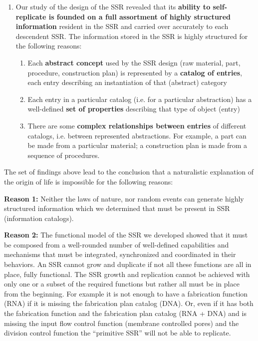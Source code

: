 \begin{enumerate}
\item Our study of the design of the SSR revealed that its
\textbf{ability to self-replicate is founded on a full assortment of
highly structured information} resident in the SSR and carried over
accurately to each descendent SSR.  The information stored in the SSR
is highly structured for the following reasons:

\begin{enumerate}
\item Each \textbf{abstract concept} used by the SSR design (raw
material, part, procedure, construction plan) is represented by a
\textbf{catalog of entries}, each entry describing an instantiation of
that (abstract) category
\item Each entry in a particular catalog (i.e. for a particular
abstraction) has a well-defined \textbf{set of properties} describing
that type of object (entry)
\item There are some \textbf{complex relationships between entries} of
different catalogs, i.e. between represented abstractions. For example,
a part can be made from a particular material; a construction plan is
made from a sequence of procedures.
\end{enumerate}
\end{enumerate}
The set of findings above lead to the conclusion that a naturalistic
explanation of the origin of life is impossible for the following
reasons:


\bigskip

\textbf{Reason 1:}  Neither the laws of nature, nor random events can
generate highly structured information which we determined that must be
present in SSR (information catalogs).


\bigskip

\textbf{Reason 2:}  The functional model of the SSR we developed showed
that it must be composed from a well-rounded number of well-defined
capabilities and mechanisms that must be integrated, synchronized and
coordinated in their behaviors. An SSR cannot grow and duplicate if not
all these functions are all in place, fully functional. The SSR growth
and replication cannot be achieved with only one or a subset of the
required functions but rather all must be in place from the beginning.
For example it is not enough to have a fabrication function (RNA) if it
is missing the fabrication plan catalog (DNA). Or, even if it has both
the fabrication function and the fabrication plan catalog (RNA + DNA)
and is missing the input flow control function (membrane controlled
pores) and the division control function the “primitive SSR” will not
be able to replicate.


